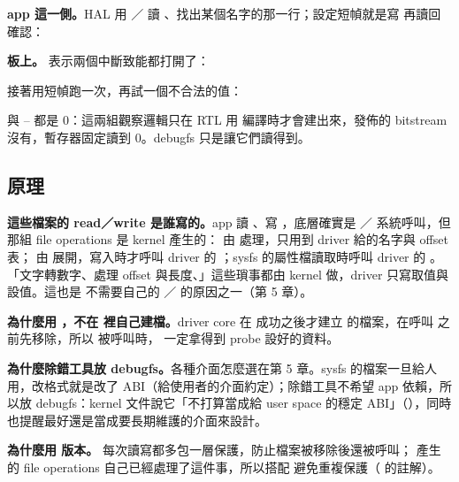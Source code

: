 
\textbf{app 這一側。}HAL 用 ／ 讀 、找出某個名字的那一行；設定短幀就是寫  再讀回確認：


\textbf{板上。} 表示兩個中斷致能都打開了：


接著用短幀跑一次，再試一個不合法的值：


 與 -- 都是 0：這兩組觀察邏輯只在 RTL 用  編譯時才會建出來，發佈的 bitstream 沒有，暫存器固定讀到 0。debugfs 只是讓它們讀得到。

\subsection{原理}

\textbf{這些檔案的 read／write 是誰寫的。}app 讀 、寫 ，底層確實是 ／ 系統呼叫，但那組 file operations 是 kernel 產生的： 由  處理，只用到 driver 給的名字與 offset 表； 由  展開，寫入時才呼叫 driver 的 ；sysfs 的屬性檔讀取時呼叫 driver 的 。「文字轉數字、處理 offset 與長度、」這些瑣事都由 kernel 做，driver 只寫取值與設值。這也是  不需要自己的 ／ 的原因之一（第 5 章）。

\textbf{為什麼用 ，不在  裡自己建檔。}driver core 在  成功之後才建立  的檔案，在呼叫  之前先移除，所以  被呼叫時， 一定拿得到 probe 設好的資料。

\textbf{為什麼除錯工具放 debugfs。}各種介面怎麼選在第 5 章。sysfs 的檔案一旦給人用，改格式就是改了 ABI（給使用者的介面約定）；除錯工具不希望 app 依賴，所以放 debugfs：kernel 文件說它「不打算當成給 user space 的穩定 ABI」（），同時也提醒最好還是當成要長期維護的介面來設計。

\textbf{為什麼用  版本。} 每次讀寫都多包一層保護，防止檔案被移除後還被呼叫； 產生的 file operations 自己已經處理了這件事，所以搭配  避免重複保護（ 的註解）。

